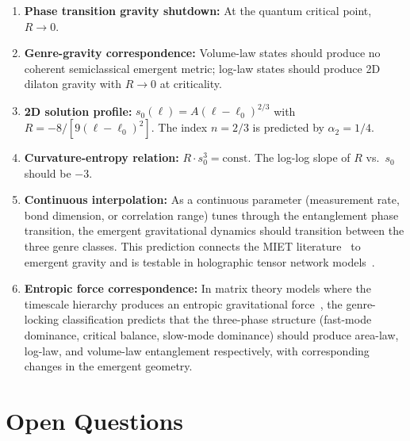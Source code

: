 \documentclass[aps,prd,twocolumn,superscriptaddress,nofootinbib,floatfix]{revtex4-2}
\newcommand{\sn}{s_0}
\begin{document}
\begin{enumerate}

\item \textbf{Phase transition gravity shutdown:} At the quantum critical point, $R \to 0$.

\item \textbf{Genre-gravity correspondence:} Volume-law states should produce no coherent semiclassical emergent metric; log-law states should produce 2D dilaton gravity with $R \to 0$ at criticality.

\item \textbf{2D solution profile:} $\sn(\ell) = A(\ell - \ell_0)^{2/3}$ with $R = -8/[9(\ell - \ell_0)^2]$. The index $n = 2/3$ is predicted by $\alpha_2 = 1/4$.

\item \textbf{Curvature-entropy relation:} $R \cdot \sn^3 = \text{const}$. The log-log slope of $R$ vs.\ $\sn$ should be $-3$.

\item \textbf{Continuous interpolation:} As a continuous parameter (measurement rate, bond dimension, or correlation range) tunes through the entanglement phase transition, the emergent gravitational dynamics should transition between the three genre classes. This prediction connects the MIET literature~\cite{LiChenFisher2018,GranetNahum2023} to emergent gravity and is testable in holographic tensor network models~\cite{VasseurPotterYouLudwig2019}.

\item \textbf{Entropic force correspondence:} In matrix theory models where the timescale hierarchy produces an entropic gravitational force~\cite{Sahakian2025}, the genre-locking classification predicts that the three-phase structure (fast-mode dominance, critical balance, slow-mode dominance) should produce area-law, log-law, and volume-law entanglement respectively, with corresponding changes in the emergent geometry.

\end{enumerate}

\section{Open Questions}
\label{sec:open}
\end{document}
